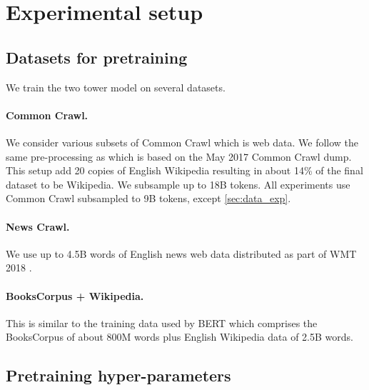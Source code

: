 \documentclass[11pt,a4paper]{article}
\begin{document}
\section{Experimental setup}

\subsection{Datasets for pretraining}
\label{sec:datasets}

We train the two tower model on several datasets.

\paragraph{Common Crawl.} We consider various subsets of Common Crawl which is web data.
We follow the same pre-processing as \citet{grave2018lrec} which is based on the May 2017 Common Crawl dump. 
This setup add 20 copies of English Wikipedia resulting in about 14\% of the final dataset to be Wikipedia. 
We subsample up to 18B tokens.
All experiments use Common Crawl subsampled to 9B tokens, except \textsection\ref{sec:data_exp}.

\paragraph{News Crawl.} We use up to 4.5B words of English news web data distributed as part of WMT 2018 \citep{bojar2018wmt}.

\paragraph{BooksCorpus + Wikipedia.} This is similar to the training data used by BERT which comprises the BooksCorpus \citep{zhu2015books} of about 800M words plus English Wikipedia data of 2.5B words.

\subsection{Pretraining hyper-parameters}
\end{document}
